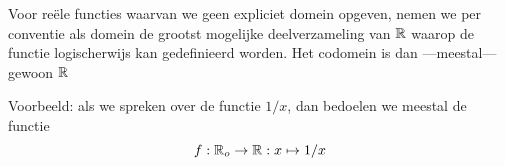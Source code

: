 \documentclass{ximera}
\begin{document}
Voor reële functies waarvan we geen expliciet domein opgeven, nemen we per conventie als domein de grootst mogelijke deelverzameling van $\mathbb{R}$ waarop de functie logischerwijs kan gedefinieerd worden. Het codomein is dan ---meestal--- gewoon $\mathbb{R}$ 

Voorbeeld: als we spreken over de functie $1/x$, dan bedoelen we meestal de functie
$$
f: \mathbb{R}_o \to \mathbb{R}: x\mapsto 1/x
$$


\end{document}
